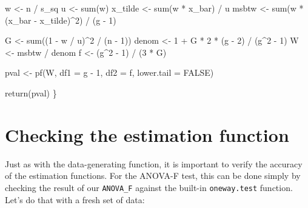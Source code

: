 \documentclass[
]{book}
\newenvironment{Shaded}{\begin{snugshade}}{\end{snugshade}}
\newcommand{\AttributeTok}[1]{\textcolor[rgb]{0.77,0.63,0.00}{#1}}
\newcommand{\ConstantTok}[1]{\textcolor[rgb]{0.00,0.00,0.00}{#1}}
\newcommand{\DecValTok}[1]{\textcolor[rgb]{0.00,0.00,0.81}{#1}}
\newcommand{\FunctionTok}[1]{\textcolor[rgb]{0.00,0.00,0.00}{#1}}
\newcommand{\NormalTok}[1]{#1}
\newcommand{\OtherTok}[1]{\textcolor[rgb]{0.56,0.35,0.01}{#1}}
\newcommand{\SpecialCharTok}[1]{\textcolor[rgb]{0.00,0.00,0.00}{#1}}
\begin{document}
\begin{Shaded}
\begin{Highlighting}[]
\NormalTok{  w }\OtherTok{\textless{}{-}}\NormalTok{ n }\SpecialCharTok{/}\NormalTok{ s\_sq}
\NormalTok{  u }\OtherTok{\textless{}{-}} \FunctionTok{sum}\NormalTok{(w)}
\NormalTok{  x\_tilde }\OtherTok{\textless{}{-}} \FunctionTok{sum}\NormalTok{(w }\SpecialCharTok{*}\NormalTok{ x\_bar) }\SpecialCharTok{/}\NormalTok{ u}
\NormalTok{  msbtw }\OtherTok{\textless{}{-}} \FunctionTok{sum}\NormalTok{(w }\SpecialCharTok{*}\NormalTok{ (x\_bar }\SpecialCharTok{{-}}\NormalTok{ x\_tilde)}\SpecialCharTok{\^{}}\DecValTok{2}\NormalTok{) }\SpecialCharTok{/}\NormalTok{ (g }\SpecialCharTok{{-}} \DecValTok{1}\NormalTok{)}

\NormalTok{  G }\OtherTok{\textless{}{-}} \FunctionTok{sum}\NormalTok{((}\DecValTok{1} \SpecialCharTok{{-}}\NormalTok{ w }\SpecialCharTok{/}\NormalTok{ u)}\SpecialCharTok{\^{}}\DecValTok{2} \SpecialCharTok{/}\NormalTok{ (n }\SpecialCharTok{{-}} \DecValTok{1}\NormalTok{))}
\NormalTok{  denom }\OtherTok{\textless{}{-}} \DecValTok{1} \SpecialCharTok{+}\NormalTok{  G }\SpecialCharTok{*} \DecValTok{2} \SpecialCharTok{*}\NormalTok{ (g }\SpecialCharTok{{-}} \DecValTok{2}\NormalTok{) }\SpecialCharTok{/}\NormalTok{ (g}\SpecialCharTok{\^{}}\DecValTok{2} \SpecialCharTok{{-}} \DecValTok{1}\NormalTok{)}
\NormalTok{  W }\OtherTok{\textless{}{-}}\NormalTok{ msbtw }\SpecialCharTok{/}\NormalTok{ denom}
\NormalTok{  f }\OtherTok{\textless{}{-}}\NormalTok{ (g}\SpecialCharTok{\^{}}\DecValTok{2} \SpecialCharTok{{-}} \DecValTok{1}\NormalTok{) }\SpecialCharTok{/}\NormalTok{ (}\DecValTok{3} \SpecialCharTok{*}\NormalTok{ G)}

\NormalTok{  pval }\OtherTok{\textless{}{-}} \FunctionTok{pf}\NormalTok{(W, }\AttributeTok{df1 =}\NormalTok{ g }\SpecialCharTok{{-}} \DecValTok{1}\NormalTok{, }\AttributeTok{df2 =}\NormalTok{ f, }\AttributeTok{lower.tail =} \ConstantTok{FALSE}\NormalTok{)}

  \FunctionTok{return}\NormalTok{(pval)}
\NormalTok{\}}
\end{Highlighting}
\end{Shaded}

\hypertarget{checking-the-estimation-function}{%
\section{Checking the estimation function}\label{checking-the-estimation-function}}

Just as with the data-generating function, it is important to verify the accuracy of the estimation functions. For the ANOVA-F test, this can be done simply by checking the result of our \texttt{ANOVA\_F} against the built-in \texttt{oneway.test} function. Let's do that with a fresh set of data:
\end{document}
